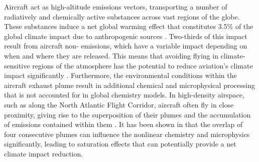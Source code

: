 Aircraft act as high-altitude emissions vectors, transporting a number of radiatively and chemically active substances across vast regions of the globe. These substances induce a net global warming effect that constitutes 3.5\% of the global climate impact due to anthropogenic sources \cite{Lee2021}. Two-thirds of this impact result from aircraft non- emissions, which have a variable impact depending on when and where they are released. This means that avoiding flying in climate-sensitive regions of the atmosphere has the potential to reduce aviation's climate impact significantly \cite{Niklass2019a}. Furthermore, the environmental conditions within the aircraft exhaust plume result in additional chemical and microphysical processing that is not accounted for in global chemistry models. In high-density airspace, such as along the North Atlantic Flight Corridor, aircraft often fly in close proximity, giving rise to the superposition of their plumes and the accumulation of emissions contained within them \cite{Schlager1997}. It has been shown in \cite{Cameron2013} that the overlap of four consecutive plumes can influence the nonlinear chemistry and microphysics significantly, leading to saturation effects that can potentially provide a net climate impact reduction. 













